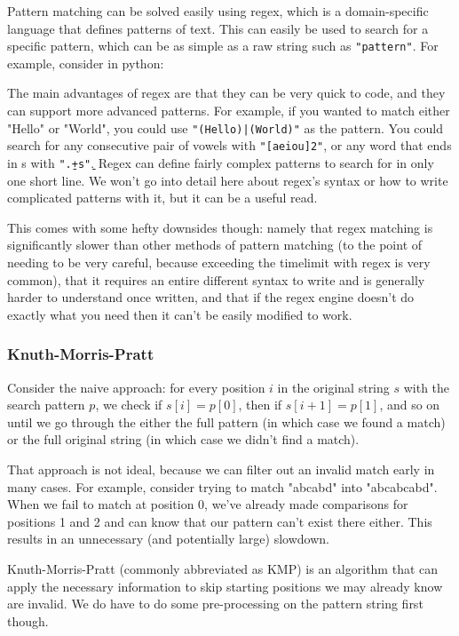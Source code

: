 Pattern matching can be solved easily using regex, which is a domain-specific language that defines patterns of text. This can easily be used to search for a specific pattern, which can be as simple as a raw string such as \texttt{"pattern"}. For example, consider in python:


The main advantages of regex are that they can be very quick to code, and they can support more advanced patterns. For example, if you wanted to match either "Hello" or "World", you could use \texttt{"(Hello)|(World)"} as the pattern. You could search for any consecutive pair of vowels with \texttt{"[aeiou]{2}"}, or any word that ends in s with \texttt{"\b.+s\b"}. Regex can define fairly complex patterns to search for in only one short line. We won't go into detail here about regex's syntax or how to write complicated patterns with it, but it can be a useful read.

This comes with some hefty downsides though: namely that regex matching is significantly slower than other methods of pattern matching (to the point of needing to be very careful, because exceeding the timelimit with regex is very common), that it requires an entire different syntax to write and is generally harder to understand once written, and that if the regex engine doesn't do exactly what you need then it can't be easily modified to work.

\subsubsection{Knuth-Morris-Pratt}

Consider the naive approach: for every position $i$ in the original string $s$ with the search pattern $p$, we check if $s[i] = p[0]$, then if $s[i+1] = p[1]$, and so on until we go through the either the full pattern (in which case we found a match) or the full original string (in which case we didn't find a match).

That approach is not ideal, because we can filter out an invalid match early in many cases. For example, consider trying to match "abcabd" into "abcabcabd". When we fail to match at position 0, we've already made comparisons for positions 1 and 2 and can know that our pattern can't exist there either. This results in an unnecessary (and potentially large) slowdown.

Knuth-Morris-Pratt (commonly abbreviated as KMP) is an algorithm that can apply the necessary information to skip starting positions we may already know are invalid. We do have to do some pre-processing on the pattern string first though.

